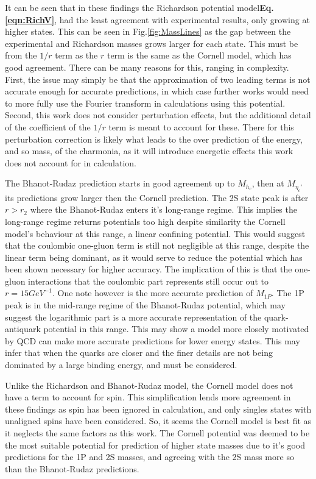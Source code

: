 \documentclass[10pt,twocolumn]{revtex4}    %
\begin{document}
It can be seen that in these findings the Richardson potential model\textbf{Eq.\ref{eqn:RichV}}, had the least agreement with experimental results, only growing at higher states. This can be seen in Fig.\ref{fig:MassLines} as the gap between the experimental and Richardson masses grows larger for each state. This must be from the $1/r$ term as the $r$ term is the same as the Cornell model, which has good agreement. There can be many reasons for this, ranging in complexity.
First, the issue may simply be that the approximation of two leading terms is not accurate enough for accurate predictions, in which case further works would need to more fully use the Fourier transform in calculations using this potential. Second, this work does not consider perturbation effects, but the additional detail of the coefficient of the $1/r$ term is meant to account for these. There for this perturbation correction is likely what leads to the over prediction of the energy, and so mass, of the charmonia, as it will introduce energetic effects this work does not account for in calculation.


The Bhanot-Rudaz prediction starts in good agreement up to $M_{h_c}$, then at $M_{\eta_c'}$ its predictions grow larger then the Cornell prediction. The 2S state peak is after $r > r_2$ where the Bhanot-Rudaz enters it's long-range regime. This implies the long-range regime returns potentials too high despite similarity the Cornell model's behaviour at this range, a linear confining potential. This would suggest that the coulombic one-gluon term is still not negligible at this range, despite the linear term being dominant, as it would serve to reduce the potential which has been shown necessary for higher accuracy. The implication of this is that the one-gluon interactions that the coulombic part represents still occur out to $r=15GeV^{-1}$. 
One note however is the more accurate prediction of $M_{1P}$. The 1P peak is in the mid-range regime of the Bhanot-Rudaz potential, which may suggest the logarithmic part is a more accurate representation of the quark-antiquark potential in this range. This may show a model more closely motivated by QCD can make more accurate predictions for lower energy states. This may infer that when the quarks are closer and the finer details are not being dominated by a large binding energy, and must be considered.

Unlike the Richardson and Bhanot-Rudaz model, the Cornell model does not have a term to account for spin. This simplification lends more agreement in these findings as spin has been ignored in calculation, and only singles states with unaligned spins have been considered. So, it seems the Cornell model is best fit as it neglects the same factors as this work. 
The Cornell potential was deemed to be the most suitable potential for prediction of higher state masses due to it's good predictions for the 1P and 2S masses, and agreeing with the 2S mass more so than the Bhanot-Rudaz predictions. 
\end{document}
